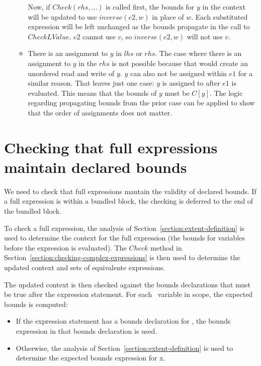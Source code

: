 \begin{itemize}
\begin{itemize}
Now, if $Check(rhs, \ldots)$ is called first, the bounds for $y$ in the context will be updated to use
$inverse(e2, w)$ in place of $w$.  Each substituted expression will be left unchanged as the bounds
propagate in the call to $CheckLValue$.  $e2$ cannot use $v$, so $inverse(e2, w)$ will not use $v$.

\item There is an assignment to $y$ in $lhs$ or $rhs$.   The case where there is an assignment 
to $y$ in the $rhs$ is not possible because that would create an unordered read and write of $y$.
$y$ can also not be assigned within $e1$ for a similar reason.  That leaves just one case: $y$ is
assigned to after $e1$ is evaluated.  This means that the bounds of $y$ must be $C[y]$.   The logic
regarding propagating bounds from the prior case can be applied to show that the order of
assignments does not matter.
\end{itemize}
\end{itemize}


\section{Checking that full expressions maintain declared bounds}
\label{section:checking-full-expressions}

We need to check that full expressions mantain the validity of
declared bounds.  If a full expression is within a
bundled block, the checking is deferred to the end of the bundled block.

To check a full expression, the analysis of 
Section~\ref{section:extent-definition} is used
to determine the context for the full expression (the bounds
for variables before the expression is evaluated). The $Check$
method in Section~\ref{section:checking-complex-expressions}
is then used to determine the updated context and sets of equivalente expressions.

The updated context is then checked against the bounds declarations that
must be true after the expression statement. For each
\arrayptr\ variable  in scope, the expected bounds is
computed:

\begin{itemize}
\item
  If the expression statement has a bounds declaration for , the
  bounds expression in that bounds declaration is used.
\item
  Otherwise, the analysis of Section~\ref{section:extent-definition}
  is used to determine the
  expected bounds expression for x.
\end{itemize}

